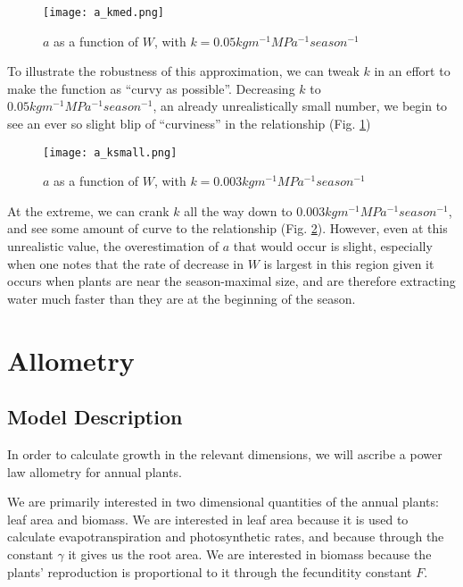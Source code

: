 \documentclass{article}
\begin{document}
  \begin{figure}[h]
    \caption{$a$ as a function of $W$, with $k = 0.05 kg m^{-1} MPa^{-1} season^{-1}$}
    \centering
    \texttt{[image: a\_kmed.png]}
    \label{fig:a0.05}
  \end{figure}

  To illustrate the robustness of this approximation, we can tweak $k$
  in an effort to make the function as ``curvy as possible''. Decreasing
  $k$ to $0.05 kg m^{-1} MPa^{-1} season^{-1}$, an already unrealistically
  small number, we begin to see an ever so slight blip of ``curviness'' in the
  relationship (Fig. \ref{fig:a0.05})

  \begin{figure}[h]
    \caption{$a$ as a function of $W$, with $k = 0.003 kg m^{-1} MPa^{-1} season^{-1}$}
    \centering
    \texttt{[image: a\_ksmall.png]}
    \label{fig:a0.003}
  \end{figure}

  At the extreme, we can crank $k$ all the way down to
  $0.003 kg m^{-1} MPa^{-1} season^{-1}$, and see some amount of curve to the
  relationship (Fig. \ref{fig:a0.003}). However, even at this unrealistic value,
  the overestimation of $a$ that would occur is slight, especially when one notes that the rate of
  decrease in $W$ is largest in this region given it occurs when plants are near
  the season-maximal size, and are therefore extracting water much faster than
  they are at the beginning of the season.

  \section{Allometry}

  \subsection{Model Description} \label{allometric model description}

  In order to calculate growth in the relevant dimensions, we will ascribe a
  power law allometry for annual plants.

  We are primarily interested in two dimensional quantities of the annual
  plants: leaf area and biomass. We are interested in leaf area because it is
  used to calculate evapotranspiration and photosynthetic rates, and because
  through the constant $\gamma$ it gives us the root area. We are
  interested in biomass because the plants' reproduction is proportional to it
  through the fecunditity constant $F$.
\end{document}
